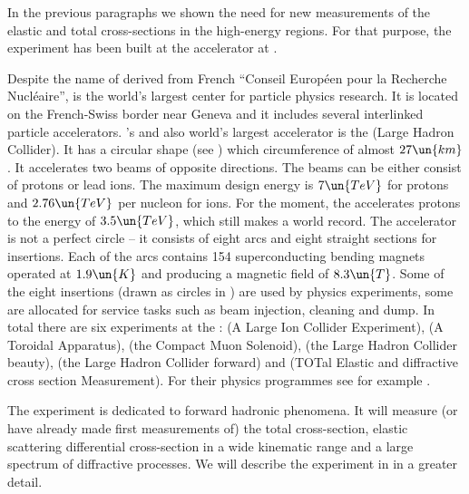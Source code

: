 In the previous paragraphs we shown the need for new measurements of the elastic and total cross-sections in the high-energy regions. For that purpose, the  experiment has been built at the  accelerator at .

Despite the name of  derived from French ``Conseil Europ\' een pour la Recherche Nucl\' eaire'',   is the world's largest center for particle physics research. It is located on the French-Swiss border near Geneva and it includes several interlinked particle accelerators. 's and also world's largest accelerator is the   (Large Hadron Collider). It has a circular shape (see ) which circumference of almost $27\un{km}$. It accelerates two beams of opposite directions. The beams can be either consist of protons or lead ions. The maximum design energy is $7\un{TeV}$ for protons and $2.76\un{TeV}$ per nucleon for ions. For the moment, the  accelerates protons to the energy of $3.5\un{TeV}$, which still makes a world record. The accelerator is not a perfect circle -- it consists of eight arcs and eight straight sections for insertions. Each of the arcs contains 154 superconducting bending magnets operated at $1.9\un{K}$ and producing a magnetic field of $8.3\un{T}$. Some of the eight insertions (drawn as circles in ) are used by physics experiments, some are allocated for service tasks such as beam injection, cleaning and dump. In total there are six experiments at the :  (A Large Ion Collider Experiment),  (A Toroidal  Apparatus),  (the Compact Muon Solenoid),  (the Large Hadron Collider beauty),  (the Large Hadron Collider forward) and  (TOTal Elastic and diffractive cross section Measurement). For their physics programmes see for example .

The  experiment is dedicated to forward hadronic phenomena. It will measure (or have already made first measurements of) the total cross-section, elastic scattering differential cross-section in a wide kinematic range and a large spectrum of diffractive processes. We will describe the experiment in  in a greater detail.




